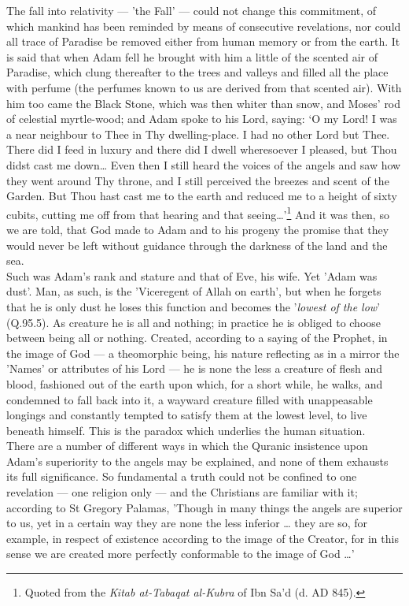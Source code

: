 \documentclass[10pt, twoside,openright]{book}
\begin{document}
The fall into relativity --- 'the Fall' --- could not change this commitment, of which mankind has been 
reminded by means of consecutive revelations, nor could all trace of Paradise be removed either from 
human memory or from the earth. It is said that when Adam fell he brought with him a little of the 
scented air of Paradise, which clung thereafter to the trees and valleys and filled all the place 
with perfume (the perfumes known to us are derived from that scented air). With him too came the 
Black Stone, which was then whiter than snow, and Moses' rod of celestial myrtle\hyp{}wood; and Adam spoke 
to his Lord, saying: `O my Lord! I was a near neighbour to Thee in Thy dwelling\hyp{}place. I had no other 
Lord but Thee. There did I feed in luxury and there did I dwell wheresoever I pleased, but Thou didst 
cast me down\ldots{} Even then I still heard the voices of the angels and saw how they went around Thy 
throne, and I still perceived the breezes and scent of the Garden. But Thou hast cast me to the earth 
and reduced me to a height of sixty cubits, cutting me off from that hearing and that seeing\ldots{}'\footnote{Quoted from the \emph{Kitab at\hyp{}Tabaqat al\hyp{}Kubra} of Ibn Sa'd (d. AD 845).}
And it was then, so we are told, that God made to Adam and to his progeny the promise that they would 
never be left without guidance through the darkness of the land and the sea. \\

Such was Adam's rank and stature and that of Eve, his wife. Yet 'Adam was dust'. Man, as such, is the 
'Viceregent of Allah on earth', but when he forgets that he is only dust he loses this function and 
becomes the '\emph{lowest of the low}' (Q.95.5). As creature he is all and nothing; in practice he is obliged 
to choose between being all or nothing. Created, according to a saying of the Prophet, in the image 
of God --- a theomorphic being, his nature reflecting as in a mirror the 'Names' or attributes of his 
Lord --- he is none the less a creature of flesh and blood, fashioned out of the earth upon which, for 
a short while, he walks, and condemned to fall back into it, a wayward creature filled with 
unappeasable longings and constantly tempted to satisfy them at the lowest level, to live beneath 
himself. This is the paradox which underlies the human situation. \\

There are a number of different ways in which the Quranic insistence upon Adam's superiority to the 
angels may be explained, and none of them exhausts its full significance. So fundamental a truth 
could not be confined to one revelation --- one religion only --- and the Christians are familiar with 
it; according to St Gregory Palamas, 'Though in many things the angels are superior to us, yet in a 
certain way they are none the less inferior \ldots{} they are so, for example, in respect of existence 
according to the image of the Creator, for in this sense we are created more perfectly conformable to 
the image of God \ldots{}' \\
\end{document}
